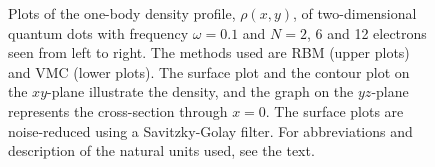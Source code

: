 \begin{figure}
	\hspace{0.1cm}
	\hspace{-0.cm}
	\hspace{-0.cm}
	
	\caption{Plots of the one-body density profile, $\rho(x, y)$, of two-dimensional quantum dots with frequency $\omega=0.1$ and $N=2$, 6 and 12 electrons seen from left to right. The methods used are RBM (upper plots) and VMC (lower plots). The surface plot and the contour plot on the $xy$-plane illustrate the density, and the graph on the $yz$-plane represents the cross-section through $x=0$. The surface plots are noise-reduced using a Savitzky-Golay filter. For abbreviations and description of the natural units used, see the text.}
	\label{fig:lowfreqRBM}
\end{figure}

\newpage
